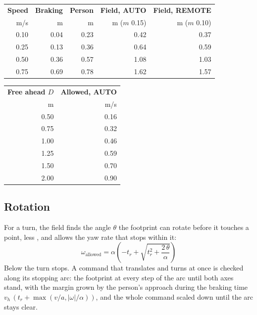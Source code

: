 \begin{center}
\begin{small}
\begin{tabular}{@{}rrrrr@{}}
  \toprule
  \textbf{Speed} & \textbf{Braking} & \textbf{Person} & \textbf{Field, AUTO} & \textbf{Field, REMOTE} \\
  m/s & m & m & m ($m$ \num{0.15}) & m ($m$ \num{0.10}) \\
  \midrule
  0.10 & 0.04 & 0.23 & 0.42 & 0.37 \\
  0.25 & 0.13 & 0.36 & 0.64 & 0.59 \\
  0.50 & 0.36 & 0.57 & 1.08 & 1.03 \\
  0.75 & 0.69 & 0.78 & 1.62 & 1.57 \\
  \bottomrule
\end{tabular}
\qquad
\begin{tabular}{@{}rr@{}}
  \toprule
  \textbf{Free ahead $D$} & \textbf{Allowed, AUTO} \\
  m & m/s \\
  \midrule
  0.50 & 0.16 \\
  0.75 & 0.32 \\
  1.00 & 0.46 \\
  1.25 & 0.59 \\
  1.50 & 0.70 \\
  2.00 & 0.90 \\
  \bottomrule
\end{tabular}
\end{small}
\end{center}

\subsection{Rotation}

For a turn, the field finds the angle $\theta$ the footprint can rotate before it touches a
point, less , and allows the yaw rate that stops within it:
\begin{equation}
  \omega_{\text{allowed}} = \alpha\left(-t_r + \sqrt{t_r^2 + \frac{2\,\theta}{\alpha}}\right)
\end{equation}
Below  the turn stops. A command that translates and turns at once is checked
along its stopping arc: the footprint at every step of the arc until both axes stand, with the
margin grown by the person's approach during the braking time
$v_h\,(t_r + \max(v/a, |\omega|/\alpha))$, and the whole command scaled down until the arc stays
clear.

